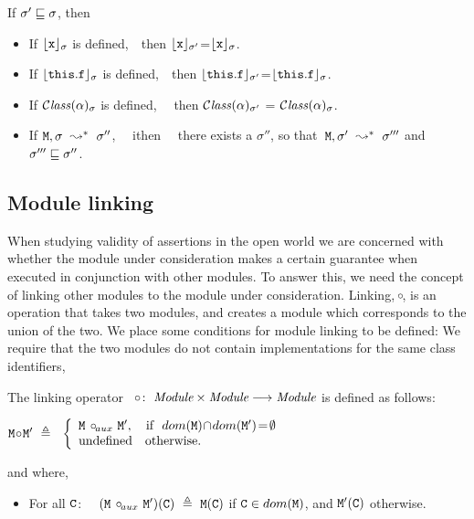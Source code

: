  
\begin{lemma}
If $\sigma'  \sqsubseteq \sigma$, then

\begin{itemize}
\item
If ${\lfloor{ {{\mbox{\tt{x}}}}}\rfloor_{\sigma}}$ is defined,\ \  then ${\lfloor{ {{\mbox{\tt{x}}}}}\rfloor_{\sigma'}}$=${\lfloor{ {{\mbox{\tt{x}}}}}\rfloor_{\sigma}}$.
\item
If ${\lfloor{ {{\mbox{\tt{this}}}.{\mbox{\tt{f}}}}}\rfloor_{\sigma}}$ is defined,\ \  then ${\lfloor{ {{\mbox{\tt{this}}}.{\mbox{\tt{f}}}}}\rfloor_{\sigma'}}$=${\lfloor{ {{\mbox{\tt{this}}}.{\mbox{\tt{f}}}}}\rfloor_{\sigma}}$.
\item
If ${\mathcal C}{\mathit{lass}}(\alpha)_{\sigma} $  is defined, \ \ then  ${\mathcal C}{\mathit{lass}}(\alpha)_{\sigma'} $  = ${\mathcal C}{\mathit{lass}}(\alpha)_{\sigma} $. 
\item
If $\M, \sigma \ \leadsto^*\ \sigma''$, \ \ ithen     \ \ there exists a $\sigma''$, so that\ $\M, \sigma'\ \leadsto^*\ \sigma'''$
and $\sigma''' \sqsubseteq \sigma''$.
\end{itemize}
\end{lemma}




\subsection{Module linking}

When studying validity of assertions in the open world we are concerned with whether   the  module 
under consideration makes  a certain guarantee when executed in conjunction with other modules. To answer this, we 
 need the concept of linking other modules to the module  under consideration.
 Linking, $\!\circ\!$,  is an operation that takes two modules, and creates a module which corresponds  to the union of the two. 
We place some conditions for module linking to be defined: We require that the two modules do not contain implementations for the same class identifiers,  

\begin{definition}

The linking operator\  \ $\!\circ\!:\  {\mbox{\tt{{\it Module}}}} \times  {\mbox{\tt{{\it Module}}}} \longrightarrow {\mbox{\tt{{\it Module}}}}$ is defined as follows:

$
\M \link \M{'}  \ \triangleq  \ \ \left\{
\begin{array}{l}
                        \M\ \link\!_{aux}\ \M{'},\ \ \   \hbox{if}\  \ dom(\M)\!\cap\!dom(\M')\!=\!\emptyset\\
\mbox{undefined}  \ \ \ \mbox{otherwise.}
\end{array}
                    \right.$
                    
and where,                  
\begin{itemize}
     \item 
   For all  ${\mbox{\tt{C}}}$: \ \
   $(\M\ \link\!_{aux}\ \M')(\prg{C})\  \triangleq  \ \M(\prg{C})$  if  ${\mbox{\tt{C}}}\in dom({\mbox{\tt{\ensuremath{{\mbox{\tt{M}}}}}}})$, and  ${\mbox{\tt{\ensuremath{{\mbox{\tt{M}}}}}}}'({\mbox{\tt{C}}})$ otherwise.
 \end{itemize}
\end{definition}

